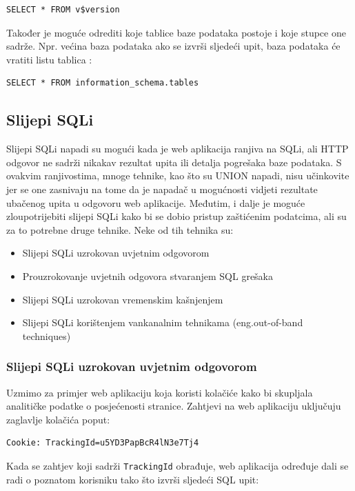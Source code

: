 \documentclass[12pt, oneside, onecolumn]{book}
\begin{document}
{\begin{verbatim}
SELECT * FROM v$version
\end{verbatim}

Također je moguće odrediti koje tablice baze podataka postoje i koje stupce one sadrže. Npr. većina baza podataka ako se izvrši sljedeći upit, baza podataka će vratiti listu tablica \cite{sitesqli}:

\begin{verbatim}
SELECT * FROM information_schema.tables
\end{verbatim}

\subsection{Slijepi SQLi}
Slijepi SQLi napadi su mogući kada je web aplikacija ranjiva na SQLi, ali HTTP odgovor ne sadrži nikakav rezultat upita ili detalja pogrešaka baze podataka. S ovakvim ranjivostima, mnoge tehnike, kao što su UNION napadi, nisu učinkovite jer se one zasnivaju na tome da je napadač u mogućnosti vidjeti rezultate ubačenog upita u odgovoru web aplikacije. Međutim, i dalje je moguće zloupotrijebiti slijepi SQLi kako bi se dobio pristup zaštićenim podatcima, ali su za to potrebne druge tehnike. Neke od tih tehnika su:

\begin{itemize}
\item Slijepi SQLi uzrokovan uvjetnim odgovorom
\item Prouzrokovanje uvjetnih odgovora stvaranjem SQL grešaka
\item Slijepi SQLi uzrokovan vremenskim kašnjenjem
\item Slijepi SQLi korištenjem vankanalnim tehnikama (eng.out-of-band techniques) 
\end{itemize}

\subsubsection{Slijepi SQLi uzrokovan uvjetnim odgovorom}
Uzmimo za primjer web aplikaciju koja koristi kolačiće kako bi skupljala analitičke podatke o posjećenosti stranice. Zahtjevi na web aplikaciju uključuju zaglavlje kolačića poput:

\begin{verbatim}
Cookie: TrackingId=u5YD3PapBcR4lN3e7Tj4
\end{verbatim}

Kada se zahtjev koji sadrži \texttt{TrackingId} obrađuje, web aplikacija određuje dali se radi o poznatom korisniku tako što izvrši sljedeći SQL upit:

}
\end{document}
